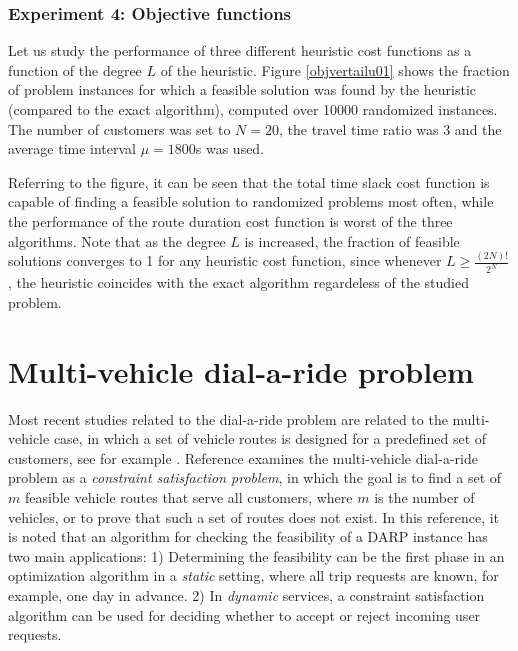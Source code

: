 \documentclass[dissertation,draft*]{aaltoseries}
\begin{document}
\subsubsection{Experiment 4: Objective functions}
Let us study the performance of three different heuristic cost functions %
as a function of the degree $L$ of the heuristic.
Figure \ref{objvertailu01} shows the fraction of problem instances for which a feasible solution was 
found by the heuristic (compared to the exact algorithm), computed over 10000
randomized instances. 
The number of customers was set to $N=20$, the travel time ratio
was $3$ and the average time interval $\mu = 1800$s was used.

Referring to the figure, it can be seen that the total time slack cost function is capable of finding
a feasible solution to randomized problems most often, while the performance of the route duration cost
function is worst of the three algorithms. Note that as the degree $L$ is increased, 
the fraction of feasible solutions converges to 1 for any heuristic cost function, since whenever $L \geq \frac{(2N)!}{2^N}$,
the heuristic coincides with the exact algorithm regardeless of the studied problem.



\section{Multi-vehicle dial-a-ride problem}
\label{multivehicle}
Most recent studies related to the dial-a-ride problem are related to the multi-vehicle case, in which 
a set of vehicle routes is designed for a predefined set of customers, see for example 
\cite{cordeau02, cordeau01, bent, ropke, xiang2006, melachrinoudis, parragh, garaix, berbegliathesis,berbegliafeas,berbegliapdp}.
Reference \cite{berbegliafeas} examines the multi-vehicle dial-a-ride problem as a \emph{constraint satisfaction problem}, in which the goal
is to find a set of $m$ feasible vehicle routes that serve all customers, where $m$ is the 
number of vehicles, or to prove that such a set of routes does not exist.
In this reference, it is noted that 
an algorithm for checking the feasibility of a DARP instance has two main applications:  
1) Determining the feasibility can be the first phase in an 
optimization algorithm in a \emph{static} setting, where all trip requests are known, for example, one day in advance. 
2) In \emph{dynamic} services, a constraint satisfaction algorithm can be used 
for deciding whether to accept or reject incoming user requests. 
% 
\end{document}
